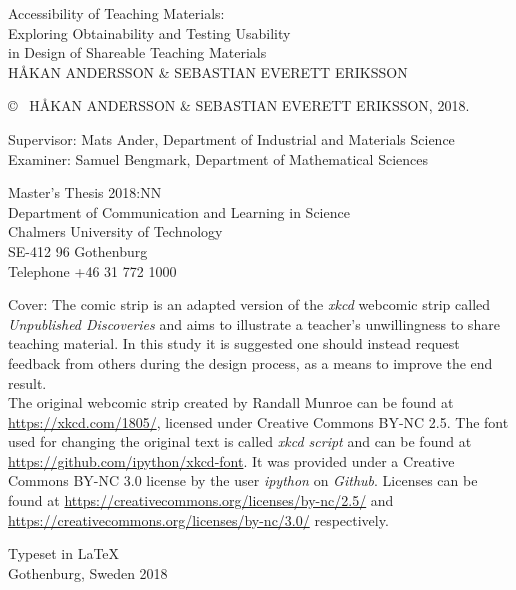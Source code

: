 \newpage
\thispagestyle{plain}
\vspace*{4.5cm}
Accessibility of Teaching Materials:\\
Exploring Obtainability and Testing Usability \\ in Design of Shareable Teaching Materials\\
HÅKAN ANDERSSON \& SEBASTIAN EVERETT ERIKSSON  \setlength{\parskip}{1cm}

\copyright ~ HÅKAN ANDERSSON \& SEBASTIAN EVERETT ERIKSSON, 2018. \setlength{\parskip}{1cm}

Supervisor: Mats Ander, Department of Industrial and Materials Science\\
Examiner: Samuel Bengmark, Department of Mathematical Sciences \setlength{\parskip}{1cm}

Master's Thesis 2018:NN\\	%
Department of Communication and Learning in Science\\
Chalmers University of Technology\\
SE-412 96 Gothenburg\\
Telephone +46 31 772 1000 \setlength{\parskip}{0.5cm}

\vfill
Cover: The comic strip is an adapted version of the \textit{xkcd} webcomic strip called \textit{Unpublished Discoveries} and aims to illustrate a teacher's unwillingness to share teaching material. In this study it is suggested one should instead request feedback from others during the design process, as a means to improve the end result. \\
{\scriptsize The original webcomic strip created by Randall Munroe can be found at \url{https://xkcd.com/1805/}, licensed under Creative Commons BY-NC 2.5. The font used for changing the original text is called \textit{xkcd script} and can be found at \url{https://github.com/ipython/xkcd-font}. It was provided under a Creative Commons BY-NC 3.0 license by the user \textit{ipython} on \textit{Github}. Licenses can be found at \url{https://creativecommons.org/licenses/by-nc/2.5/} and \url{https://creativecommons.org/licenses/by-nc/3.0/} respectively.} \setlength{\parskip}{0.5cm}

Typeset in \LaTeX \\
Gothenburg, Sweden 2018

